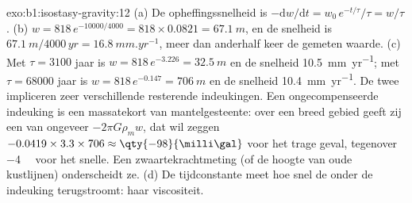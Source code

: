 \begin{solution}{exo:b1:isostasy-gravity:12}
(a) De opheffingssnelheid is $-\mathrm dw/\mathrm dt = w_0\,e^{-t/\tau}/\tau = w/\tau$.
(b) $w = 818\,e^{-10000/4000} = 818\times0.0821 = \qty{67.1}{m}$, en de snelheid is
$\qty{67.1}{m}/\num{4000}\,\unit{yr} = \qty{16.8}{mm.yr^{-1}}$, meer dan anderhalf keer de gemeten waarde. (c) Met $\tau = 3100$ jaar is $w =
818\,e^{-3.226} = \qty{32.5}{m}$ en de snelheid \qty{10.5}{mm.yr^{-1}}; met
$\tau = \num{68000}$ jaar is $w = 818\,e^{-0.147} = \qty{706}{m}$ en de snelheid
\qty{10.4}{mm.yr^{-1}}. De twee impliceren zeer verschillende resterende indeukingen.
Een ongecompenseerde indeuking is een massatekort van mantelgesteente: over een breed gebied geeft zij een  van ongeveer $-2\pi G\rho_m w$, dat wil zeggen
$-0.0419\times3.3\times706 \approx \qty{-98}{\milli\gal}$ voor het trage geval, tegenover \qty{-4}{\milli\gal} voor het snelle. Een zwaartekrachtmeting (of de hoogte van oude kustlijnen) onderscheidt ze. (d) De tijdconstante meet hoe snel de  onder de indeuking terugstroomt: haar viscositeit.
\end{solution}

